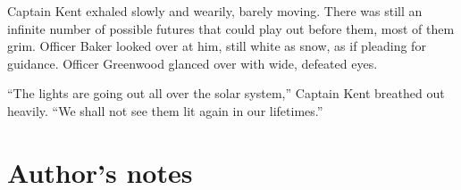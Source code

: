 \documentclass[12pt]{article} %
\begin{document}
Captain Kent exhaled slowly and wearily, barely moving. There was still an infinite number of possible futures that could play out before them, most of them grim. Officer Baker looked over at him, still white as snow, as if pleading for guidance. Officer Greenwood glanced over with wide, defeated eyes.

``The lights are going out all over the solar system,'' Captain Kent breathed out heavily. ``We shall not see them lit again in our lifetimes.''

\newpage
\section{Author's notes}
\printendnotes
\end{document}
